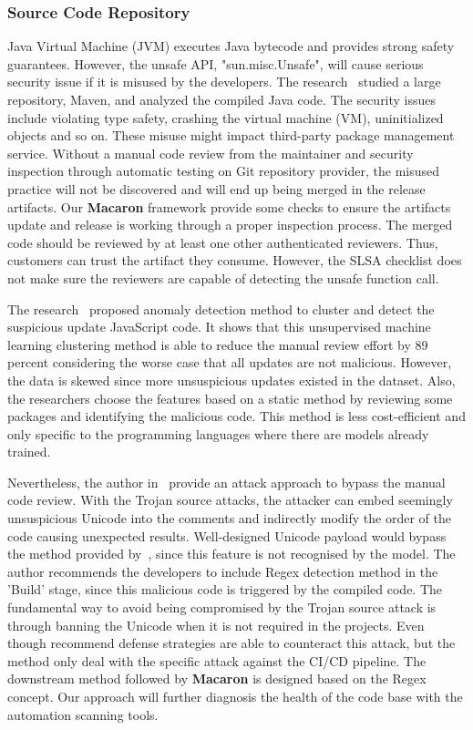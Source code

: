 \subsubsection{Source Code Repository}
Java Virtual Machine (JVM) executes Java bytecode and provides strong safety
guarantees. However, the unsafe API, "sun.misc.Unsafe", will cause serious 
security issue if it is misused by the developers. The research~\cite{mastrangelo2015use} 
studied a large repository, Maven, and analyzed the compiled Java code. The 
security issues include violating type safety, crashing the virtual machine (VM), 
uninitialized objects and so on. These misuse might impact third-party package 
management service. Without a manual code review from the maintainer and security inspection through automatic testing on Git repository
provider, the misused practice will not be discovered and will end up being merged in the release
artifacts. Our \textbf{Macaron} framework provide some checks to ensure the artifacts update and release
is working through a proper inspection process. The merged code should be reviewed by at least one other authenticated reviewers.
Thus, customers can trust the artifact they consume. However, the SLSA checklist does not make sure the reviewers
are capable of detecting the unsafe function call.

The research~\cite{garrett2019detecting} proposed anomaly detection method to cluster and detect 
the suspicious update JavaScript code. It shows that this unsupervised machine learning 
clustering method is able to reduce the manual review effort by 89 percent considering the worse
case that all updates are not malicious. However, the data is skewed since more unsuspicious updates
existed in the dataset. Also, the researchers choose the features based on a static method by reviewing some packages and identifying the malicious code. 
This method is less cost-efficient and only specific to the programming languages where there are models already trained. 

Nevertheless, the author in~\cite{boucher2023trojan} provide an attack approach to bypass the manual code review. 
With the Trojan source attacks, the attacker can embed seemingly unsuspicious Unicode into
the comments and indirectly modify the order of the code causing unexpected results. 
Well-designed Unicode payload would bypass the method provided by~\cite{garrett2019detecting}, 
since this feature is not recognised by the model. The author recommends the developers to include 
Regex detection method in the 'Build' stage, since this malicious code is triggered by the compiled code.
The fundamental way to avoid being compromised by the Trojan source attack is through banning the 
Unicode when it is not required in the projects. Even though recommend defense strategies 
are able to counteract this attack, but the method only deal with the specific attack against the 
CI/CD pipeline. The downstream method followed by \textbf{Macaron} is designed based on the Regex concept. Our approach
will further diagnosis the health of the code base with the automation scanning tools.

